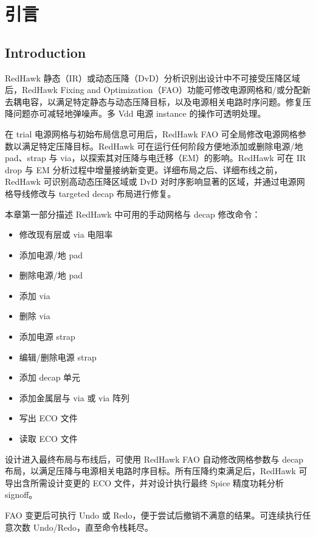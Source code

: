 ﻿%
\label{chap:grid}

\section{引言}
\subsection*{Introduction}

RedHawk 静态（IR）或动态压降（DvD）分析识别出设计中不可接受压降区域后，RedHawk Fixing and Optimization（FAO）功能可修改电源网格和/或分配新去耦电容，以满足特定静态与动态压降目标，以及电源相关电路时序问题。修复压降问题亦可减轻地弹噪声。多 Vdd 电源 instance 的操作可透明处理。

在 trial 电源网格与初始布局信息可用后，RedHawk FAO 可全局修改电源网格参数以满足特定压降目标。RedHawk 可在运行任何阶段方便地添加或删除电源/地 pad、strap 与 via，以探索其对压降与电迁移（EM）的影响。RedHawk 可在 IR drop 与 EM 分析过程中增量接纳新变更。详细布局之后、详细布线之前，RedHawk 可识别高动态压降区域或 DvD 对时序影响显著的区域，并通过电源网格导线修改与 targeted decap 布局进行修复。

本章第一部分描述 RedHawk 中可用的手动网格与 decap 修改命令：
\begin{itemize}
  \item 修改现有层或 via 电阻率
  \item 添加电源/地 pad
  \item 删除电源/地 pad
  \item 添加 via
  \item 删除 via
  \item 添加电源 strap
  \item 编辑/删除电源 strap
  \item 添加 decap 单元
  \item 添加金属层与 via 或 via 阵列
  \item 写出 ECO 文件
  \item 读取 ECO 文件
\end{itemize}

设计进入最终布局与布线后，可使用 RedHawk FAO 自动修改网格参数与 decap 布局，以满足压降与电源相关电路时序目标。所有压降约束满足后，RedHawk 可导出含所需设计变更的 ECO 文件，并对设计执行最终 Spice 精度功耗分析 signoff。

FAO 变更后可执行 Undo 或 Redo，便于尝试后撤销不满意的结果。可连续执行任意次数 Undo/Redo，直至命令栈耗尽。

